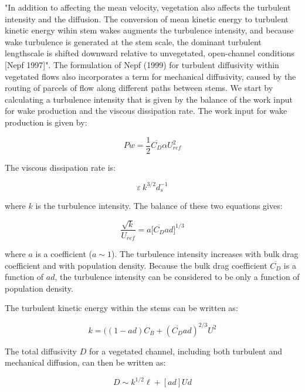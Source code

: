 \documentclass[11pt]{article}
\begin{document}
"In addition to affecting the mean velocity, vegetation also affects the turbulent intensity and the diffusion. The conversion of mean kinetic energy to turbulent kinetic energy wihin stem wakes augments the turbulence intensity, and because wake turbulence is generated at the stem scale, the dominant turbulent lengthscale is shifted downward relative to unvegetated, open-channel conditions [Nepf 1997]". The formulation of Nepf (1999) for turbulent diffusivity within vegetated flows also incorporates a term for mechanical diffusivity, caused by the routing of parcels of flow along different paths between stems. We start by calculating a turbulence intensity that is given by the balance of the work input for wake production and the viscous dissipation rate. The work input for wake production is given by:

\begin{equation}
Pw = \frac{1}{2}\overline{C_D} \alpha U_{ref}^2
\end{equation}

The viscous dissipation rate is:

\begin{equation}
\varepsilon ~ k^{3/2} d_s^{-1}
\end{equation}

\noindent where $k$ is the turbulence intensity. The balance of these two equations gives:

\begin{equation}
\frac{\sqrt{k}}{U_{ref}} = a\big[\overline{C_D} ad\big]^{1/3}
\end{equation}

\noindent where $a$ is a coefficient ($a\sim1$). The turbulence intensity increases with bulk drag coefficient and with population density. Because the bulk drag coefficient $\overline{C_D}$ is a function of $ad$, the turbulence intensity can be considered to be only a function of population density.

The turbulent kinetic energy within the stems can be written as:

\begin{equation}
k = ((1 - ad) C_B + (\overline{C_D} ad)^{2/3} U^2
\end{equation}

The total diffusivity $D$ for a vegetated channel, including both turbulent and mechanical diffusion, can then be written as:

\begin{equation}
D \sim k^{1/2} \ell + [ad]Ud
\end{equation}
\end{document}
